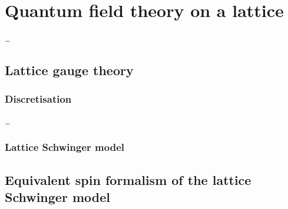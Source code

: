 \documentclass[../main.tex]{subfiles} %
\begin{document}
\chapter{Quantum field theory on a lattice} \label{chap:LatticeQFT}

\ldots



\section{Lattice gauge theory}

\subsection{Discretisation}

\ldots


\subsection{Lattice Schwinger model}

\lipsum



\section{Equivalent spin formalism of the lattice Schwinger model}

\lipsum
\end{document}
